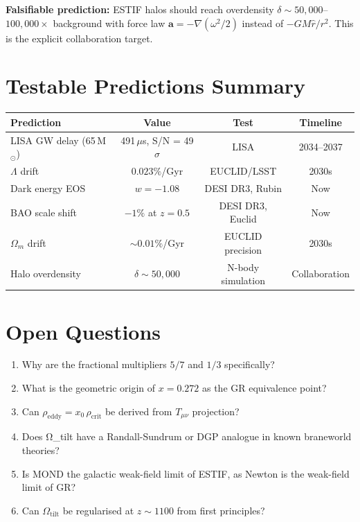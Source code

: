 \documentclass[12pt]{article}
\begin{document}
\textbf{Falsifiable prediction:} ESTIF halos should reach overdensity $\delta \sim 50{,}000$--$100{,}000\times$ background with force law $\mathbf{a} = -\nabla(\omega^2/2)$ instead of $-GM\hat{r}/r^2$. This is the explicit collaboration target.

\section{Testable Predictions Summary}

\begin{center}
\begin{tabular}{lccc}
\toprule
Prediction & Value & Test & Timeline \\
\midrule
LISA GW delay (65\,M$_\odot$) & 491\,$\mu$s, S/N = 49$\sigma$ & LISA & 2034--2037 \\
$\Lambda$ drift & $0.023\%$/Gyr & EUCLID/LSST & 2030s \\
Dark energy EOS & $w = -1.08$ & DESI DR3, Rubin & Now \\
BAO scale shift & $-1\%$ at $z=0.5$ & DESI DR3, Euclid & Now \\
$\Omega_m$ drift & $\sim 0.01\%$/Gyr & EUCLID precision & 2030s \\
Halo overdensity & $\delta \sim 50{,}000$ & N-body simulation & Collaboration \\
\bottomrule
\end{tabular}
\end{center}

\section{Open Questions}

\begin{enumerate}
\item Why are the fractional multipliers $5/7$ and $1/3$ specifically?
\item What is the geometric origin of $x = 0.272$ as the GR equivalence point?
\item Can $\rho_\text{eddy} = x_0\,\rho_\text{crit}$ be derived from $T_{\mu\nu}$ projection?
\item Does Ω\_tilt have a Randall-Sundrum or DGP analogue in known braneworld theories?
\item Is MOND the galactic weak-field limit of ESTIF, as Newton is the weak-field limit of GR?
\item Can $\Omega_\text{tilt}$ be regularised at $z \sim 1100$ from first principles?
\end{enumerate}
\end{document}
